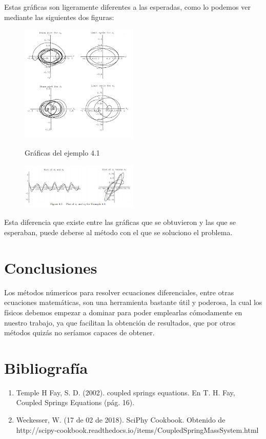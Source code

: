 \documentclass{article}
\begin{document}
Estas gráficas son ligeramente diferentes a las esperadas, como lo podemos ver mediante las siguientes dos figuras:
\begin{figure}[H]
    \caption{Gráficas del ejemplo 4.1}
    \includegraphics[width=0.5\textwidth]{Ejemplo8.PNG}
    \centering
    \label{Cod}
\end{figure}
\begin{figure}[H]
    \includegraphics[width=0.5\textwidth]{Ejemplo8-1.PNG}
    \centering
    \label{Cod}
\end{figure}
Esta diferencia que existe entre las gráficas que se obtuvieron y las que se esperaban, puede deberse al método con el que se soluciono el problema.

\section{Conclusiones}
Los métodos númericos para resolver ecuaciones diferenciales, entre otras ecuaciones matemáticas, son una herramienta bastante útil y poderosa, la cual los físicos debemos empezar a dominar para poder emplearlas cómodamente en nuestro trabajo, ya que facilitan la obtención de resultados, que por otros métodos quizás no seríamos capaces de obtener.

\section{Bibliografía}
\begin{enumerate}
\item Temple H Fay, S. D. (2002). coupled springs equations. En T. H. Fay, Coupled Springs Equations (pág. 16).
\item Weckesser, W. (17 de 02 de 2018). SciPhy Cookbook. Obtenido de http://scipy-cookbook.readthedocs.io/items/CoupledSpringMassSystem.html
\end {enumerate}
 
\end{document}
